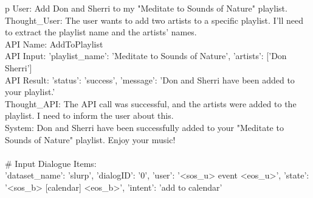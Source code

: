 \begin{table*}
\begin{tabular}{p\linewidth}
User: Add Don and Sherri to my "Meditate to Sounds of Nature" playlist.   \\
Thought\_User: The user wants to add two artists to a specific playlist. I'll need to extract the playlist name and the artists' names.   \\
API Name: AddToPlaylist   \\
API Input: {'playlist\_name': 'Meditate to Sounds of Nature', 'artists': ['Don Sherri']}   \\
API Result: {'status': 'success', 'message': 'Don and Sherri have been added to your playlist.'}   \\
Thought\_API: The API call was successful, and the artists were added to the playlist. I need to inform the user about this.   \\
System: Don and Sherri have been successfully added to your "Meditate to Sounds of Nature" playlist. Enjoy your music!   \\
 \\
\# Input Dialogue Items: \\
{'dataset\_name': 'slurp', 'dialogID': '0', 'user': '<sos\_u> event <eos\_u>', 'state': '<sos\_b> [calendar] <eos\_b>', 'intent': 'add to calendar'}\\
\bottomrule
\end{tabular}
\end{table*}